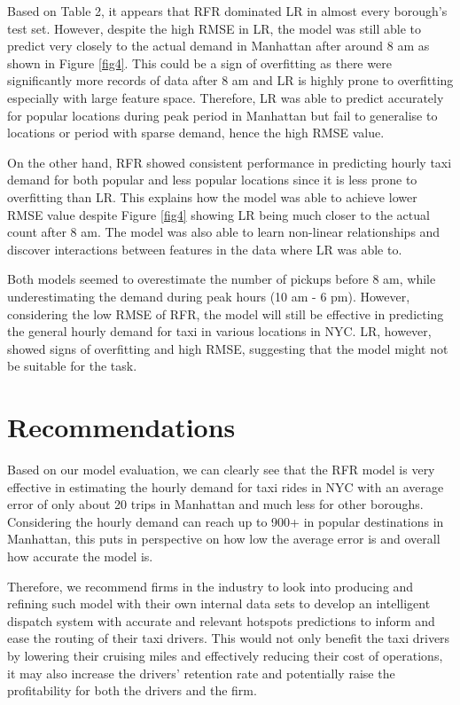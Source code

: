\documentclass[11pt]{article}
\begin{document}
Based on Table 2, it appears that RFR dominated LR in almost every borough's test set. However, despite the high RMSE in LR, the model was still able to predict very closely to the actual demand in Manhattan after around 8 am as shown in Figure \ref{fig4}. This could be a sign of overfitting as there were significantly more records of data after 8 am and LR is highly prone to overfitting especially with large feature space. Therefore, LR was able to predict accurately for popular locations during peak period in Manhattan but fail to generalise to locations or period with sparse demand, hence the high RMSE value.

On the other hand, RFR showed consistent performance in predicting hourly taxi demand for both popular and less popular locations since it is less prone to overfitting than LR. This explains how the model was able to achieve lower RMSE value despite Figure \ref{fig4} showing LR being much closer to the actual count after 8 am. The model was also able to learn non-linear relationships and discover interactions between features in the data where LR was able to.

Both models seemed to overestimate the number of pickups before 8 am, while underestimating the demand during peak hours (10 am - 6 pm). However, considering the low RMSE of RFR, the model will still be effective in predicting the general hourly demand for taxi in various locations in NYC. LR, however, showed signs of overfitting and high RMSE, suggesting that the model might not be suitable for the task.

\label{analysis}

\section{Recommendations}
Based on our model evaluation, we can clearly see that the RFR model is very effective in estimating the hourly demand for taxi rides in NYC with an average error of only about 20 trips in Manhattan and much less for other boroughs. Considering the hourly demand can reach up to 900+ in popular destinations in Manhattan, this puts in perspective on how low the average error is and overall how accurate the model is.

Therefore, we recommend firms in the industry to look into producing and refining such model with their own internal data sets to develop an intelligent dispatch system with accurate and relevant hotspots predictions to inform and ease the routing of their taxi drivers. This would not only benefit the taxi drivers by lowering their cruising miles and effectively reducing their cost of operations, it may also increase the drivers' retention rate and potentially raise the profitability for both the drivers and the firm. 
\end{document}
